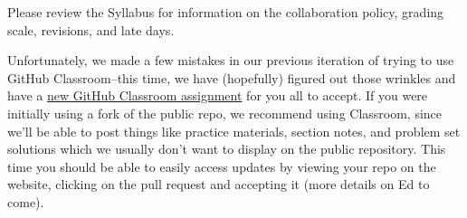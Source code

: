 \documentclass[11pt]{article}
\begin{document}

Please review the Syllabus for information on the collaboration policy, grading scale, revisions, and late days.

Unfortunately, we made a few mistakes in our previous iteration of trying to use GitHub Classroom--this time, we have (hopefully) figured out those wrinkles and have a \href{https://classroom.github.com/a/hCzdB8ze}{new GitHub Classroom assignment} for you all to accept. If you were initially using a fork of the public repo, we recommend using Classroom, since we'll be able to post things like practice materials, section notes, and problem set solutions which we usually don't want to display on the public repository. This time you should be able to easily access updates by viewing your repo on the website, clicking on the pull request and accepting it (more details on Ed to come).
\end{document}
